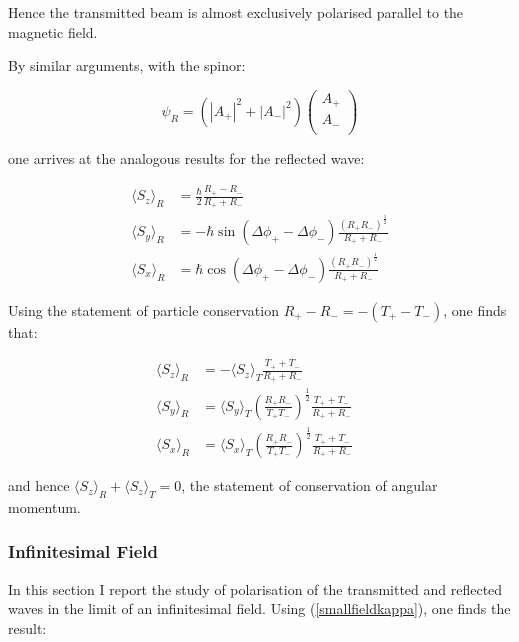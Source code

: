 \documentclass{article}
\begin{document}
\noindent Hence the transmitted beam is almost exclusively polarised parallel to the magnetic field.

\noindent By similar arguments, with the spinor:

\begin{equation}
	\psi_R = (|A_{+}|^2+|A_{-}|^2)
	\begin{pmatrix}
		A_{+}\\
		A_{-}\\
	\end{pmatrix}
\end{equation}

\noindent one arrives at the analogous results for the reflected wave:

\begin{align}
	\langle S_z \rangle_R &= \frac{\hbar}{2}\frac{R_+-R_-}{R_++R_-}\\
	\langle S_y \rangle_R &= -\hbar \sin{(\Delta\phi_+-\Delta\phi_-)}\frac{(R_+R_-)^{\frac{1}{2}}}{R_++R_-}\\
	\langle S_x \rangle_R &= \hbar \cos{(\Delta\phi_+-\Delta\phi_-)}\frac{(R_+R_-)^{\frac{1}{2}}}{R_++R_-}
\end{align}

\noindent Using the statement of particle conservation $R_+-R_-=-(T_+-T_-)$, one finds that:

\begin{subequations}\label{stsrrelations}
\begin{flalign}
	\langle S_z \rangle_R &= -\langle S_z \rangle_T \frac{T_++T_-}{R_++R_-}&\\
	\langle S_y \rangle_R &= \langle S_y \rangle_T \left(\frac{R_+R_-}{T_+T_-}\right)^{\frac{1}{2}}\frac{T_++T_-}{R_++R_-} \\
	\langle S_x \rangle_R &= \langle S_x \rangle_T \left(\frac{R_+R_-}{T_+T_-}\right)^{\frac{1}{2}}\frac{T_++T_-}{R_++R_-}
\end{flalign}
\end{subequations}

\noindent and hence $\langle S_z \rangle_R + \langle S_z \rangle_T = 0$, the statement of conservation of angular momentum. 

\subsubsection{Infinitesimal Field}
In this section I report the study of polarisation of the transmitted and reflected waves in the limit of an infinitesimal field. Using (\ref{smallfieldkappa}), one finds the result:
\end{document}

